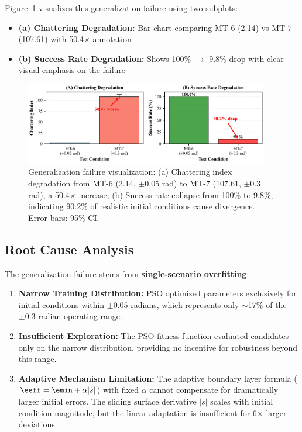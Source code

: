 Figure~\ref{fig:robustness_degradation} visualizes this generalization failure using two subplots:
\begin{itemize}
    \item \textbf{(a) Chattering Degradation:} Bar chart comparing MT-6 (2.14) vs MT-7 (107.61) with 50.4$\times$ annotation
    \item \textbf{(b) Success Rate Degradation:} Shows 100\% $\to$ 9.8\% drop with clear visual emphasis on the failure
\end{itemize}

\begin{figure}[t]
\centering
\includegraphics[width=0.95\textwidth]{../figures/fig6_robustness_degradation.pdf}
\caption{Generalization failure visualization: (a) Chattering index degradation from MT-6 (2.14, $\pm$0.05 rad) to MT-7 (107.61, $\pm$0.3 rad), a 50.4$\times$ increase; (b) Success rate collapse from 100\% to 9.8\%, indicating 90.2\% of realistic initial conditions cause divergence. Error bars: 95\% CI.}
\label{fig:robustness_degradation}
\end{figure}

\subsection{Root Cause Analysis}
\label{subsec:mt7_root_cause}

The generalization failure stems from \textbf{single-scenario overfitting}:

\begin{enumerate}
    \item \textbf{Narrow Training Distribution:} PSO optimized parameters exclusively for initial conditions within $\pm 0.05$ radians, which represents only $\sim$17\% of the $\pm 0.3$ radian operating range.

    \item \textbf{Insufficient Exploration:} The PSO fitness function evaluated candidates only on the narrow distribution, providing no incentive for robustness beyond this range.

    \item \textbf{Adaptive Mechanism Limitation:} The adaptive boundary layer formula ($\eeff = \emin + \alpha|\dot{s}|$) with fixed $\alpha$ cannot compensate for dramatically larger initial errors. The sliding surface derivative $|\dot{s}|$ scales with initial condition magnitude, but the linear adaptation is insufficient for 6$\times$ larger deviations.
\end{enumerate}

